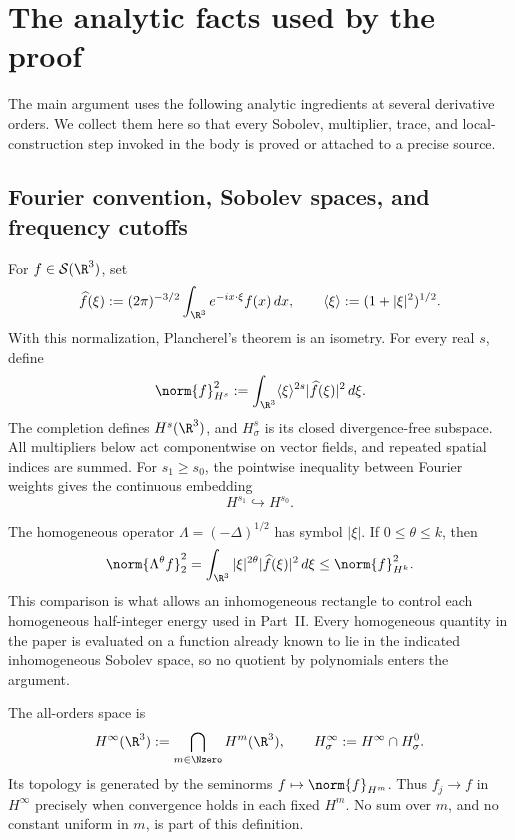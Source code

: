 \appendix

\section{The analytic facts used by the proof}
\label{app:analytic-framework}

The main argument uses the following analytic ingredients at several
derivative orders.  We collect them here so that every Sobolev, multiplier,
trace, and local-construction step invoked in the body is proved or attached
to a precise source.

\subsection{Fourier convention, Sobolev spaces, and frequency cutoffs}

For \(f\in\mathcal S(\R^3)\), set
\[
 \widehat f(\xi)
 :=(2\pi)^{-3/2}\int_{\R^3}e^{-ix\cdot\xi}f(x)\,dx,
 \qquad
 \langle\xi\rangle:=(1+|\xi|^2)^{1/2}.
\]
With this normalization, Plancherel's theorem is an isometry.
For every real \(s\), define
\[
 \norm{f}_{H^s}^2
 :=\int_{\R^3}\langle\xi\rangle^{2s}|\widehat f(\xi)|^2\,d\xi.
\]
The completion defines \(H^s(\R^3)\), and \(H^s_\sigma\) is its closed divergence-free subspace.
All multipliers below act componentwise on vector fields, and repeated spatial indices are summed.
For \(s_1\ge s_0\), the pointwise inequality between Fourier weights gives the continuous embedding
\[
 H^{s_1}\hookrightarrow H^{s_0}.
\]

The homogeneous operator \(\Lambda=(-\Delta)^{1/2}\) has symbol \(|\xi|\).
If \(0\le\theta\le k\), then
\[
 \norm{\Lambda^\theta f}_2^2
 =\int_{\R^3}|\xi|^{2\theta}|\widehat f(\xi)|^2\,d\xi
 \le\norm{f}_{H^k}^2.
\]
This comparison is what allows an inhomogeneous rectangle to control each homogeneous half-integer energy used in Part~II.
Every homogeneous quantity in the paper is evaluated on a function already known to lie in the indicated inhomogeneous Sobolev space, so no quotient by polynomials enters the argument.

The all-orders space is
\[
 H^\infty(\R^3):=\bigcap_{m\in\Nzero}H^m(\R^3),
 \qquad
 H^\infty_\sigma:=H^\infty\cap H^0_\sigma.
\]
Its topology is generated by the seminorms \(f\mapsto\norm{f}_{H^m}\).
Thus \(f_j\to f\) in \(H^\infty\) precisely when convergence holds in each fixed \(H^m\).
No sum over \(m\), and no constant uniform in \(m\), is part of this definition.

